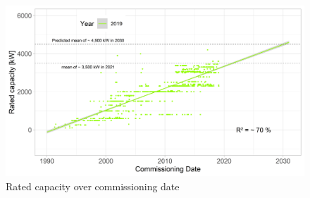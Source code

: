 \documentclass[a4paper,11pt]{article}
\begin{document}
\begin{figure}

{\centering \includegraphics[width=1\linewidth]{data/Amprion/results_of_analysis/rated_capacity_over_commissioning} 

}

\caption{Rated capacity over commissioning date}\label{fig:ratedcapacity}
\end{figure}
\end{document}
